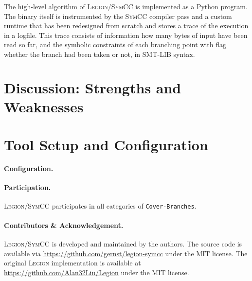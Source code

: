 \documentclass{llncs}
\newcommand{\code}[1]{\texttt{#1}}
\newcommand{\Legion}{\textsc{Legion}\xspace}
\newcommand{\SymCC}{\textsc{SymCC}\xspace}
\begin{document}
The high-level algorithm of \Legion/\SymCC is implemented as a Python program.
The binary itself is instrumented by the \SymCC compiler pass and a custom runtime
that has been redesigned from scratch and stores a trace of the execution in a logfile.
This trace consists of information how many bytes of input have been read so far,
and the symbolic constraints of each branching point with flag whether the branch had been taken or not, in SMT-LIB syntax.

\section{Discussion: Strengths and Weaknesses}
\label{sec:discussion}

\section{Tool Setup and Configuration}
\label{sec:project}


\paragraph{Configuration.}

\paragraph{Participation.}
\Legion/\SymCC participates in all categories of \code{Cover-Branches}.

\paragraph{Contributors \& Acknowledgement.}

\Legion/\SymCC is developed and maintained by the authors.
The source code is available via \url{https://github.com/gernst/legion-symcc} under the MIT license.
The original \Legion implementation is available at \url{https://github.com/Alan32Liu/Legion} under the MIT license.



\end{document}
